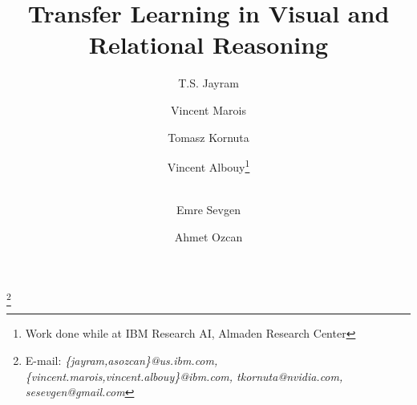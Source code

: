 \documentclass[11pt]{article}
\begin{document}
\title{Transfer Learning in Visual and Relational Reasoning}


\newcommand\blfootnote[1]{%
	\begingroup
	\renewcommand\thefootnote{}\footnote{#1}%
	\addtocounter{footnote}{-1}%
	\endgroup
}

\renewcommand\Authands{ and }
\author[1]{T.S. Jayram}
\author[2]{Vincent Marois}
\author[3]{Tomasz Kornuta}
\author[ ]{Vincent Albouy\thanks{Work done while at IBM Research AI, Almaden Research Center}}
\author[*]{\\Emre Sevgen}
\author[1]{Ahmet Ozcan}

\date{}

\maketitle
\blfootnote{E-mail: {\scriptsize \textit{\{jayram,asozcan\}@us.ibm.com,  \{vincent.marois,vincent.albouy\}@ibm.com, tkornuta@nvidia.com, sesevgen@gmail.com}}}
\end{document}

